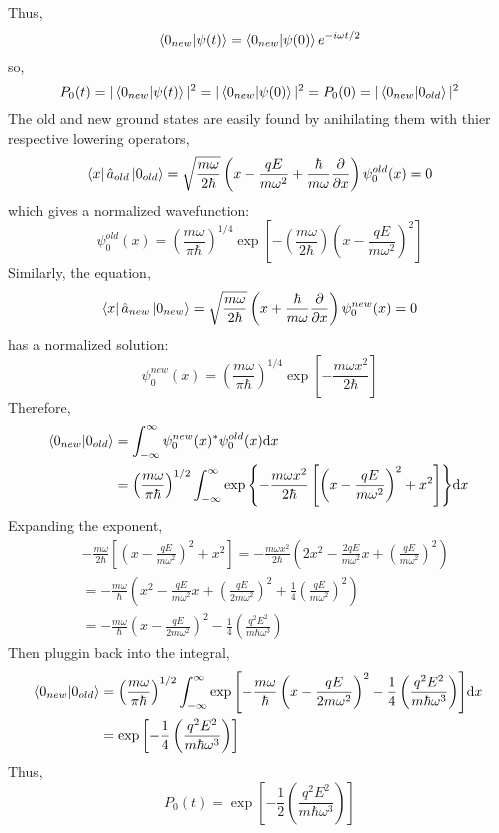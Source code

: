 \documentclass[12pt]{extarticle}
\begin{document}
\begin{enumerate}
Thus, \[\left< 0_{new} | \psi(t) \right> = \left< 0_{new} | \psi(0) \right> e^{-i \omega t /2}\]
so, \[P_0(t) = |\left< 0_{new} | \psi(t) \right>|^2 = | \left< 0_{new} | \psi(0) \right>|^2 = P_0(0) = | \left< 0_{new} | 0_{old} \right>|^2\]
The old and new ground states are easily found by anihilating them with thier respective lowering operators,
\[\left< x \right| \hat{a}_{old} \left| 0_{old} \right> = \sqrt{\frac{m \omega}{2 \hbar}} \left(x - \frac{qE}{m \omega^2} + \frac{\hbar}{m \omega} \frac{\partial{}}{\partial{x}}  \right) \psi_0^{old}(x) = 0\] 
which gives a normalized wavefunction: \[\psi_0^{old}(x) = \left( \frac{m \omega}{\pi \hbar} \right)^{1/4} \exp{\left[ - \left(\frac{m \omega}{2 \hbar} \right) \left( x - \frac{qE}{m \omega^2} \right)^2  \right] }\]
Similarly, the equation, 
\[\left< x \right| \hat{a}_{new} \left| 0_{new} \right> = \sqrt{\frac{m \omega}{2 \hbar}} \left(x + \frac{\hbar}{m \omega} \frac{\partial{}}{\partial{x}}  \right) \psi_0^{new}(x) = 0\] 
has a normalized solution: \[\psi_0^{new}(x) = \left( \frac{m \omega}{\pi \hbar} \right)^{1/4}  \exp{\left[ - \frac{m \omega x^2}{2 \hbar} \right]}\]
Therefore, 
\begin{align*}
\left< 0_{new} | 0_{old} \right> &= \int_{-\infty}^{\infty} \psi_0^{new}(x)^* \psi_0^{old}(x) \mathrm{d}x \: \\ & =
\left( \frac{m \omega}{\pi \hbar} \right)^{1/2} \int_{-\infty}^{\infty} \exp{\left\{- \frac{m \omega x^2}{2 \hbar} \left[\left( x - \frac{qE}{m \omega^2} \right)^2 + x^2 \right] \right\}} \mathrm{d}x \:
\end{align*}
Expanding the exponent, 
\begin{align*}
& - \frac{m \omega}{2 \hbar} \left[\left( x - \frac{qE}{m \omega^2} \right)^2 + x^2 \right] = - \frac{m \omega x^2}{2 \hbar} \left( 2 x^2 - \frac{2qE}{m \omega^2} x +  \left( \frac{qE}{m \omega^2} \right)^2 \right) \\ &= - \frac{m \omega}{ \hbar} \left( x^2 - \frac{qE}{m \omega^2} x +  \left( \frac{qE}{2 m \omega^2} \right)^2 + \frac{1}{4} \left( \frac{qE}{m \omega^2} \right)^2 \right) \\ &= - \frac{m \omega}{ \hbar} \left(x - \frac{qE}{2 m \omega^2} \right)^2 - \frac{1}{4} \left( \frac{q^2E^2}{m \hbar \omega^3} \right)
\end{align*}
Then pluggin back into the integral,
\begin{align*}
\left< 0_{new} | 0_{old} \right> &= 
\left( \frac{m \omega}{\pi \hbar} \right)^{1/2} \int_{-\infty}^{\infty} \exp{\left[ - \frac{m \omega}{ \hbar} \left(x - \frac{qE}{2 m \omega^2} \right)^2 - \frac{1}{4} \left( \frac{q^2E^2}{m \hbar \omega^3} \right) \right]} \mathrm{d}x \: \\ &= \exp{\left[  - \frac{1}{4} \left( \frac{q^2E^2}{m \hbar \omega^3} \right) \right]}
\end{align*} 
Thus, \[P_0(t) = \exp{\left[ - \frac{1}{2} \left( \frac{q^2E^2}{m \hbar \omega^3} \right)\right]}\]
\end{enumerate}
\end{document}
